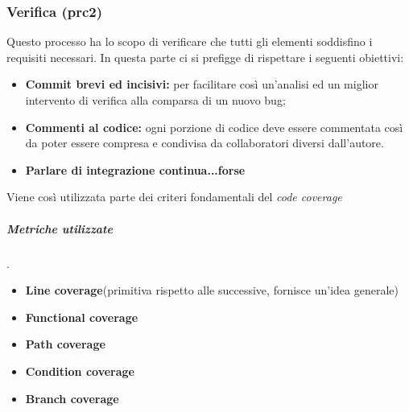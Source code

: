 \subsubsection{Verifica (prc2)}
Questo processo ha lo scopo di verificare che tutti gli elementi soddisfino i requisiti necessari. In questa parte ci si prefigge di rispettare i seguenti obiettivi:
\begin{itemize}
	\item{\textbf{Commit brevi ed incisivi:} per facilitare così un'analisi ed un miglior intervento di verifica alla comparsa di un nuovo bug;}
	\item{\textbf{Commenti al codice:} ogni porzione di codice deve essere commentata così da poter essere compresa e condivisa da collaboratori diversi dall'autore.}
	\item{\textbf{Parlare di integrazione continua...forse}}
\end{itemize}
Viene così utilizzata parte dei criteri fondamentali del \textit{code coverage}
\subparagraph{Metriche utilizzate}.
\begin{itemize}
	\item{\textbf{Line coverage}(primitiva rispetto alle successive, fornisce un'idea generale)}
	\item{\textbf{Functional coverage}}
	\item{\textbf{Path coverage}}
	\item{\textbf{Condition coverage}}
	\item{\textbf{Branch coverage}}
\end{itemize}
\begin{table}[!htpb]
	\centering
	\renewcommand{\arraystretch}{2} 
	\caption{Metriche utilizzate per la Verifica}
\end{table}
